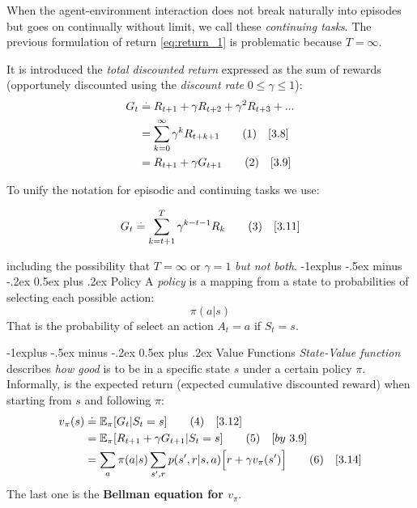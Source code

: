 \documentclass[10pt,landscape]{article}
\makeatletter
\renewcommand{\subsection}{\@startsection{subsection}{2}{0mm}%
                                {-1explus -.5ex minus -.2ex}%
                                {0.5ex plus .2ex}%
                                {\normalfont\normalsize\bfseries}}
\newcommand\numberthis{\addtocounter{equation}{1}\tag{\theequation}}
\makeatother
\begin{document}
\begin{multicols}{3}
When the agent-environment interaction does not break naturally into episodes but goes on continually without limit, we call these \emph{continuing tasks}.
The previous formulation of return \ref{eq:return_1} is problematic because $T=\infty$. 

It is introduced the \emph{total discounted return} expressed as the sum of rewards (opportunely discounted using the \emph{discount rate} $0 \le \gamma \le 1$):
\begin{align*}
G_t & \stackrel{.}{=} R_{t+1} + \gamma R_{t+2} + \gamma^2 R_{t+3} + ...\\
& = \sum_{k = 0}^\infty \gamma^k R_{t + k + 1} \numberthis \label{eq:discounted_return_1} \quad [3.8]\\
& = R_{t+1} + \gamma G_{t+1} \numberthis \label{eq:discounted_return_2} \quad [3.9]
\end{align*}

To unify the notation for episodic and continuing tasks we use:

\begin{equation}
G_t \stackrel{.}{=} \sum_{k = t+1}^T \gamma^{k-t-1} R_{k} \numberthis \label{eq:discounted_return_generic} \quad [3.11]
\end{equation}

including the possibility that $T=\infty$ or $\gamma = 1$ \emph{but not both}.
\subsection{Policy}
A \emph{policy} is a mapping from a state to probabilities of selecting each possible action:
\begin{equation}
\pi(a|s)
\label{eq: policy}
\end{equation}
That is the probability of select an action $A_t = a$ if $S_t = s$.

\subsection{Value Functions}
\emph{State-Value function} describes \emph{how good} is to be in a specific state $s$ under a certain policy $\pi$.
Informally, is the expected return (expected cumulative discounted reward) when starting from $s$ and following $\pi$:
\begin{align*}
v_{\pi}(s) & \stackrel{.}{=} \mathbb{E}_{\pi}[G_t | S_t = s] \numberthis \label{eq:v_def} \quad [3.12] \\
& = \mathbb{E}_{\pi}[R_{t+1} + \gamma G_{t+1} | S_t = s] \numberthis  \quad [by \ 3.9] \\
& = \sum_{a} \pi(a|s) \sum_{s' ,r} p(s',r | s, a) \Big[r + \gamma v_{\pi}(s')\Big] \numberthis \label{eq:v_bellman} \quad [3.14]
\end{align*}
The last one is the \textbf{Bellman equation for $v_\pi$}.


\end{multicols}
\end{document}
